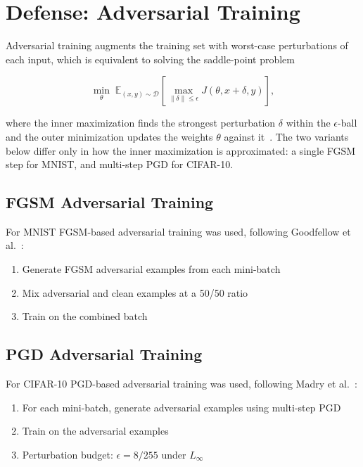 \section{Defense: Adversarial Training}

Adversarial training augments the training set with worst-case perturbations of each input, which is equivalent to solving the saddle-point problem

\begin{equation}
    \min_\theta \; \mathbb{E}_{(x,y) \sim \mathcal{D}} \left[ \max_{\|\delta\| \leq \epsilon} J(\theta, x + \delta, y) \right],
    \label{eq:adv_training}
\end{equation}

where the inner maximization finds the strongest perturbation $\delta$ within the $\epsilon$-ball and the outer minimization updates the weights $\theta$ against it~\cite{madry2018towards}. The two variants below differ only in how the inner maximization is approximated: a single FGSM step for MNIST, and multi-step PGD for CIFAR-10.

\subsection{FGSM Adversarial Training}

For MNIST FGSM-based adversarial training was used, following Goodfellow et al.~\cite{goodfellow2015explaining}:

\begin{enumerate}
    \item Generate FGSM adversarial examples from each mini-batch
    \item Mix adversarial and clean examples at a 50/50 ratio
    \item Train on the combined batch
\end{enumerate}

\subsection{PGD Adversarial Training}

For CIFAR-10 PGD-based adversarial training was used, following Madry et al.~\cite{madry2018towards}:

\begin{enumerate}
    \item For each mini-batch, generate adversarial examples using multi-step PGD
    \item Train on the adversarial examples
    \item Perturbation budget: $\epsilon = 8/255$ under $L_\infty$
\end{enumerate}

